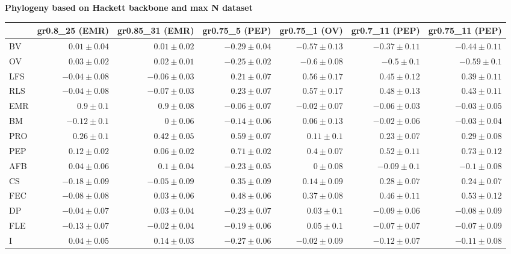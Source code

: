 \begin{landscape}

\clearpage%

\begin{table}
\center
\begin{footnotesize}

\textbf{Phylogeny based on Hackett backbone and max N dataset}

\begin{tabular}{@{}l|rrrrrr@{}}
\toprule
  & gr0.8\_25 (EMR) & gr0.85\_31 (EMR) & gr0.75\_5 (PEP) & gr0.75\_1 (OV) & gr0.7\_11 (PEP) & gr0.75\_11 (PEP)\\
\midrule
BV & $0.01 \pm 0.04$ & $0.01 \pm 0.02$ & $-0.29 \pm 0.04$ & $-0.57 \pm 0.13$ & $-0.37 \pm 0.11$ & $-0.44 \pm 0.11$\\
OV & $0.03 \pm 0.02$ & $0.02 \pm 0.01$ & $-0.25 \pm 0.02$ & $-0.6 \pm 0.08$ & $-0.5 \pm 0.1$ & $-0.59 \pm 0.1$\\
LFS & $-0.04 \pm 0.08$ & $-0.06 \pm 0.03$ & $0.21 \pm 0.07$ & $0.56 \pm 0.17$ & $0.45 \pm 0.12$ & $0.39 \pm 0.11$\\
RLS & $-0.04 \pm 0.08$ & $-0.07 \pm 0.03$ & $0.23 \pm 0.07$ & $0.57 \pm 0.17$ & $0.48 \pm 0.13$ & $0.43 \pm 0.11$\\
EMR & $0.9 \pm 0.1$ & $0.9 \pm 0.08$ & $-0.06 \pm 0.07$ & $-0.02 \pm 0.07$ & $-0.06 \pm 0.03$ & $-0.03 \pm 0.05$\\
BM & $-0.12 \pm 0.1$ & $0 \pm 0.06$ & $-0.14 \pm 0.06$ & $0.06 \pm 0.13$ & $-0.02 \pm 0.06$ & $-0.03 \pm 0.04$\\
PRO & $0.26 \pm 0.1$ & $0.42 \pm 0.05$ & $0.59 \pm 0.07$ & $0.11 \pm 0.1$ & $0.23 \pm 0.07$ & $0.29 \pm 0.08$\\
PEP & $0.12 \pm 0.02$ & $0.06 \pm 0.02$ & $0.71 \pm 0.02$ & $0.4 \pm 0.07$ & $0.52 \pm 0.11$ & $0.73 \pm 0.12$\\
AFB & $0.04 \pm 0.06$ & $0.1 \pm 0.04$ & $-0.23 \pm 0.05$ & $0 \pm 0.08$ & $-0.09 \pm 0.1$ & $-0.1 \pm 0.08$\\
CS & $-0.18 \pm 0.09$ & $-0.05 \pm 0.09$ & $0.35 \pm 0.09$ & $0.14 \pm 0.09$ & $0.28 \pm 0.07$ & $0.24 \pm 0.07$\\
FEC & $-0.08 \pm 0.08$ & $0.03 \pm 0.06$ & $0.48 \pm 0.06$ & $0.37 \pm 0.08$ & $0.46 \pm 0.11$ & $0.53 \pm 0.12$\\
DP & $-0.04 \pm 0.07$ & $0.03 \pm 0.04$ & $-0.23 \pm 0.07$ & $0.03 \pm 0.1$ & $-0.09 \pm 0.06$ & $-0.08 \pm 0.09$\\
FLE & $-0.13 \pm 0.07$ & $-0.02 \pm 0.04$ & $-0.19 \pm 0.06$ & $0.05 \pm 0.1$ & $-0.07 \pm 0.07$ & $-0.07 \pm 0.09$\\
I & $0.04 \pm 0.05$ & $0.14 \pm 0.03$ & $-0.27 \pm 0.06$ & $-0.02 \pm 0.09$ & $-0.12 \pm 0.07$ & $-0.11 \pm 0.08$\\
\bottomrule
\end{tabular}


\end{footnotesize}
\end{table}
\end{landscape}
